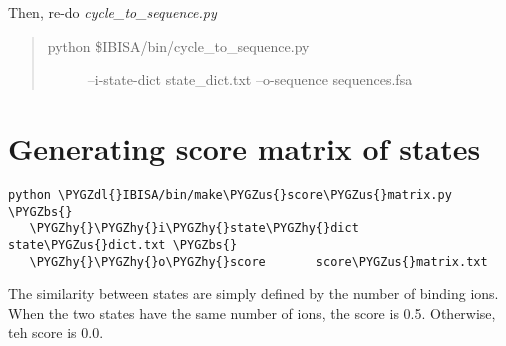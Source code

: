 \documentclass[letterpaper,10pt,english]{sphinxmanual}
\def\PYGZbs{\char`\\}
\def\PYGZus{\char`\_}
\def\PYGZdl{\char`\$}
\def\PYGZhy{\char`\-}
\begin{document}
Then, re-do \emph{cycle\_to\_sequence.py}
\begin{quote}
\begin{description}
\item[{python \$IBISA/bin/cycle\_to\_sequence.py }] \leavevmode{}

--i-state-dict state\_dict.txt --o-sequence   sequences.fsa

\end{description}
\end{quote}


\section{Generating score matrix of states}
\label{tutorial:generating-score-matrix-of-states}
\begin{Verbatim}[commandchars=\\\{\}]
python \PYGZdl{}IBISA/bin/make\PYGZus{}score\PYGZus{}matrix.py \PYGZbs{}
   \PYGZhy{}\PYGZhy{}i\PYGZhy{}state\PYGZhy{}dict  state\PYGZus{}dict.txt \PYGZbs{}
   \PYGZhy{}\PYGZhy{}o\PYGZhy{}score       score\PYGZus{}matrix.txt
\end{Verbatim}

The similarity between states are simply defined by the number of binding ions. When the two states have the same number of ions, the score is 0.5. Otherwise, teh score is 0.0.
\end{document}
